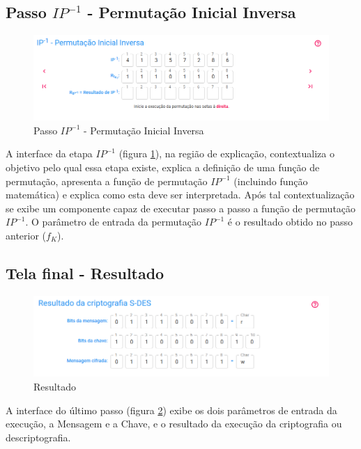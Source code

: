 \subsection{Passo \(IP^{-1}\) - Permutação Inicial Inversa}

\begin{figure}[H]
    \centering
    \caption{Passo \(IP^{-1}\) - Permutação Inicial Inversa}
    \label{fig:uiiip}
    \includegraphics[width=1\linewidth]{UI/UIIP-1.png}
\end{figure}

A interface da etapa \(IP^{-1}\) (figura \ref{fig:uiiip}), na região de explicação, contextualiza o objetivo pelo qual essa etapa existe, explica a definição de uma função de permutação, apresenta a função de permutação \(IP^{-1}\) (incluindo função matemática) e explica como esta deve ser interpretada. Após tal contextualização se exibe um componente capaz de executar passo a passo a função de permutação \(IP^{-1}\). O parâmetro de entrada da permutação \(IP^{-1}\) é o resultado obtido no passo anterior (\(f_K\)).

\subsection{Tela final - Resultado}

\begin{figure}[H]
    \centering
    \caption{Resultado}
    \label{fig:uiresult}
    \includegraphics[width=1\linewidth]{UI/UIResult.png}
\end{figure}

A interface do último passo (figura \ref{fig:uiresult}) exibe os dois parâmetros de entrada da execução, a Mensagem e a Chave, e o resultado da execução da criptografia ou descriptografia.

